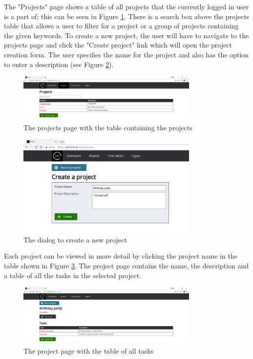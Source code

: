 \documentclass[bibliography=totoc, listof=totocnumbered]{scrartcl}
\begin{document}
The "Projects" page shows a table of all projects that the currently logged in
user is a part of; this can be seen in Figure \ref{fig:trckr-projects-table}.
There is a search box above the projects table that allows a user to filter for
a project or a group of projects containing the given keywords. To create a new
project, the user will have to navigate to the projects page and click the
"Create project" link which will open the project creation form. The user
specifies the name for the project and also has the option to enter a
description (see Figure \ref{fig:trckr-create-project}).

\begin{figure}[h]
	\includegraphics[width=0.8\textwidth]{trckr-projects-table}
	\caption{The projects page with the table containing the projects}
	\label{fig:trckr-projects-table}
\end{figure}

\begin{figure}[h]
	\includegraphics[width=0.8\textwidth]{trckr-create-project}
	\caption{The dialog to create a new project}
	\label{fig:trckr-create-project}
\end{figure}

Each project can be viewed in more detail by clicking the project name in the
table shown in Figure \ref{fig:trckr-project-page}. The project page contains
the name, the description and a table of all the tasks in the selected project.

\begin{figure}[h]
    \includegraphics[width=0.8\textwidth]{trckr-project-page}
    \caption{The project page with the table of all tasks}
    \label{fig:trckr-project-page}
\end{figure}
\end{document}
